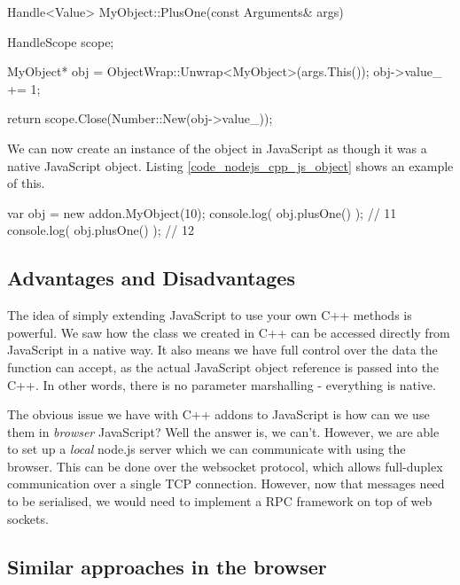 \begin{code}
Handle<Value> MyObject::PlusOne(const Arguments& args) {
  HandleScope scope;

  MyObject* obj = ObjectWrap::Unwrap<MyObject>(args.This());
  obj->value_ += 1;

  return scope.Close(Number::New(obj->value_));
}
\end{code}

We can now create an instance of the object in JavaScript as though it was a native JavaScript object. Listing \ref{code_nodejs_cpp_js_object} shows an example of this.

\begin{code}
var obj = new addon.MyObject(10);
console.log( obj.plusOne() ); // 11
console.log( obj.plusOne() ); // 12
\end{code}

\subsection{Advantages and Disadvantages} %
\label{sub:nodejs_cpp_advantages_and_disadvantages}
The idea of simply extending JavaScript to use your own C++ methods is powerful. We saw how the class we created in C++ can be accessed directly from JavaScript in a native way. It also means we have full control over the data the function can accept, as the actual JavaScript object reference is passed into the C++. In other words, there is no parameter marshalling - everything is native.

The obvious issue we have with C++ addons to JavaScript is how can we use them in \emph{browser} JavaScript? Well the answer is, we can't. However, we are able to set up a \emph{local} node.js server which we can communicate with using the browser. This can be done over the websocket protocol, which allows full-duplex communication over a single TCP connection. However, now that messages need to be serialised, we would need to implement a RPC framework on top of web sockets.


\subsection{Similar approaches in the browser} %
\label{sub:cpp_js_similar_approaches_in_the_browser}

